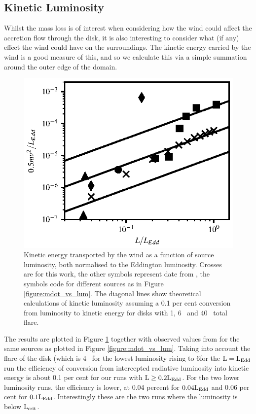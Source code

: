 \documentclass[a4paper,fleqn,usenatbib]{mnras}
\begin{document}
\subsection{Kinetic Luminosity}

Whilst the mass loss is of interest when considering how the wind could affect the 
accretion flow through the disk, it is also interesting to consider what (if any) effect the
wind could have on the surroundings. The kinetic energy carried by the wind is a
good measure of this, and so we calculate this via a simple summation around the outer
edge of the domain. 

\begin{figure}
\includegraphics[width=\columnwidth]{figures/lum_vs_ke_ponti.eps}
\caption{Kinetic energy transported by the wind  as a function of source luminosity, both
normalised to the Eddington luminosity. Crosses are for this work, the other symbols represent
date from
\protect\cite{2016AN....337..512P}, the symbols code for different sources as in Figure \ref{figure:mdot_vs_lum}.
The diagonal lines show theoretical calculations of kinetic luminosity assuming a 0.1 per cent conversion
from luminosity to kinetic energy for disks with 1\degree, 6\degree~ and 40\degree~ total flare.}
\label{figure:ke_vs_lum}
\end{figure}

The results are plotted in Figure \ref{figure:ke_vs_lum} together with observed values from
\cite{2016AN....337..512P} for the same sources as plotted in Figure \ref{figure:mdot_vs_lum}. 
Taking into account the flare of the disk (which is 4\degree~ for the lowest luminosity rising to 6\degree for
the $\rm{L=L_{Edd}}$ run the efficiency of conversion from intercepted radiative luminosity into kinetic 
energy is about 0.1 per cent for our runs with $\rm{L \geq 0.2L_{Edd}}$. For the two lower luminosity runs,
the efficiency is lower, at 0.04 percent for $\rm{0.04L_{Edd}}$ and 0.06 per cent for $\rm{0.1L_{Edd}}$.
Interestingly these are the two runs where the luminosity is below $\rm{L_{crit}}$.
\end{document}
